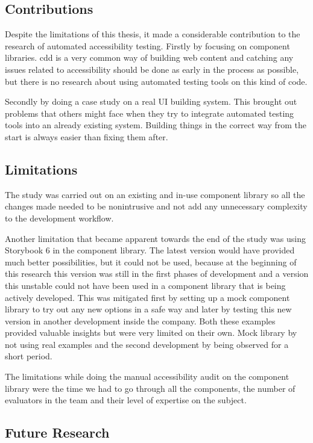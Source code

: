 \documentclass{master_thesis}
\begin{document}
\subsection{Contributions}

Despite the limitations of this thesis, it made a considerable contribution to the research of automated accessibility testing. Firstly by focusing on component libraries. \ac{cdd} is a very common way of building web content and catching any issues related to accessibility should be done as early in the process as possible, but there is no research about using automated testing tools on this kind of code.

Secondly by doing a case study on a real UI building system. This brought out problems that others might face when they try to integrate automated testing tools into an already existing system. Building things in the correct way from the start is always easier than fixing them after.

\subsection{Limitations}

The study was carried out on an existing and in-use component library so all the changes made needed to be nonintrusive and not add any unnecessary complexity to the development workflow.

Another limitation that became apparent towards the end of the study was using Storybook 6 in the component library. The latest version would have provided much better possibilities, but it could not be used, because at the beginning of this research this version was still in the first phases of development and a version this unstable could not have been used in a component library that is being actively developed. This was mitigated first by setting up a mock component library to try out any new options in a safe way and later by testing this new version in another development inside the company. Both these examples provided valuable insights but were very limited on their own. Mock library by not using real examples and the second development by being observed for a short period.

The limitations while doing the manual accessibility audit on the component library were the time we had to go through all the components, the number of evaluators in the team and their level of expertise on the subject.

\subsection{Future Research}
\end{document}
